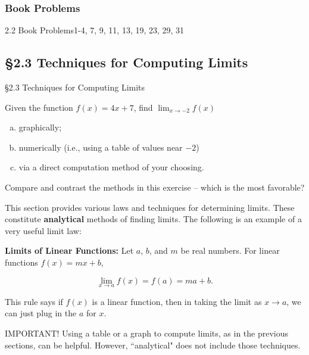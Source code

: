 \documentclass[cal1spr16Lectures.tex]{subfiles}
\begin{document}
\subsubsection{Book Problems}
\begin{frame}
\begin{block}{2.2 Book Problems}1-4, 7, 9, 11, 13, 19, 23, 29, 31 \end{block} 
\end{frame}

\subsection[2.3 Techniques for Computing Limits]{\S 2.3 Techniques for Computing Limits}

\begin{frame}{\S 2.3 Techniques for Computing Limits}\footnotesize
\begin{exe}
Given the function $f(x)=4x+7$, find $\lim_{x\to -2}f(x)$
\begin{enumerate}[(a)]
	\item graphically;
	\item numerically (i.e., using a table of values near $-2$)
	\item via a direct computation method of your choosing.
	\end{enumerate}
\end{exe}

Compare and contrast the methods in this exercise -- which is the most favorable?
\end{frame}

\begin{frame}{}\footnotesize
This section provides various laws and techniques for determining limits.  These constitute {\bf analytical} methods of finding limits.  The following is an example of a very useful limit law:

\vspace{0.5pc}
{\bf Limits of Linear Functions:}  Let $a$, $b$, and $m$ be real numbers.  For linear functions $f(x)=mx+b$,

\vspace{-0.5pc}
\[\lim_{x \to a} f(x)=f(a)=ma+b.\]

\vspace{0.25pc}
This rule says if $f(x)$ is a linear function, then in taking the limit as $x\to a$, we can just plug in the $a$ for $x$.

\vspace{0.5pc}
\alert{IMPORTANT!} Using a table or a graph to compute limits, as in the previous sections, can be helpful.  However, ``analytical" does not include those techniques.
\end{frame}
\end{document}
